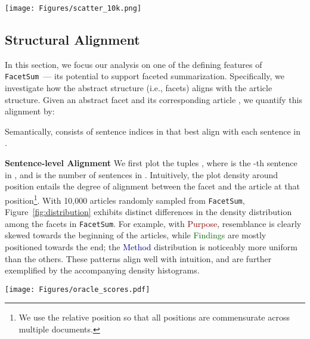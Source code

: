 \documentclass[11pt,a4paper]{article}
\newcommand{\ours}{\texttt{FacetSum}\xspace}
\newcommand{\absp}{\textcolor{darkred}{Purpose}\xspace}
\newcommand{\absm}{\textcolor{darkblue}{Method}\xspace}
\newcommand{\absf}{\textcolor{darkgreen}{Findings}\xspace}
\begin{document}
\begin{figure*}[t!]
    \centering
\texttt{[image: Figures/scatter\_10k.png]}
    \caption{Oracle sentence distribution over a paper. X-axis: 10,000 papers sampled from \ours, sorted by full text length from long to short; y-axis: normalized position in a paper. We provide each sub-figure's density histogram on their right.}
    \label{fig:distribution}
\end{figure*}

\subsection{Structural Alignment}
\label{subsection:structural_alignment}
In this section, we focus our analysis on one of the defining features of \ours\ --- its potential to support faceted summarization.
Specifically, we investigate how the abstract structure (i.e., facets) aligns with the article structure.
Given an abstract facet  and its corresponding article , we quantify this alignment by:

Semantically,  consists of sentence indices in  that best align with each sentence in .





\noindent\textbf{Sentence-level Alignment}\quad
We first plot the tuples , where  is the -th sentence in , and  is the number of sentences in .
Intuitively, the plot density around position  entails the degree of alignment between the facet  and the article  at that position\footnote{We use the relative position  so that all positions are commensurate across multiple documents.}.
With 10,000 articles randomly sampled from \ours, Figure~\ref{fig:distribution} exhibits distinct differences in the density distribution among the facets in \ours.
For example, with  \absp, resemblance is clearly skewed towards the beginning of the articles,
while \absf are mostly positioned towards the end; the \absm distribution is noticeably more uniform than the others.
These patterns align well with intuition, and are further exemplified by the accompanying density histograms.

\begin{table}[t!]
    \centering
    \texttt{[image: Figures/oracle\_scores.pdf]}
    \caption{Scores of sentence aligning in Rouge-L.}
    \label{table:oracle_scores_rl}
\end{table}
\end{document}
